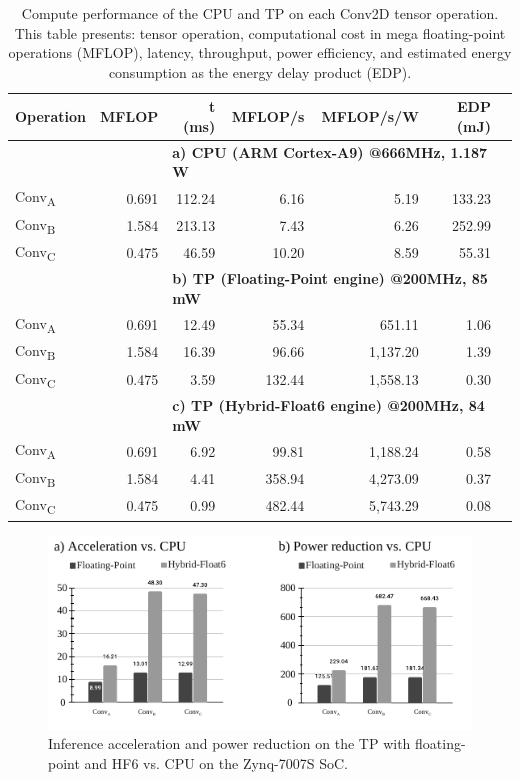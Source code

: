 \begin{table}[!t]\centering
	\caption{Compute performance of the CPU and TP on each Conv2D tensor operation. This table presents: tensor operation, computational cost in mega floating-point operations (MFLOP), latency, throughput, power efficiency, and estimated energy consumption as the energy delay product (EDP).}\label{tab:performance}
	\scriptsize
	\begin{tabular}{lrrrrrr}\toprule
		\textbf{Operation} &\textbf{MFLOP} &\textbf{t (ms)} &\textbf{MFLOP/s} &\textbf{MFLOP/s/W} &\textbf{EDP (mJ)} \\\midrule
		& &\multicolumn{4}{l}{\textbf{a) CPU (ARM Cortex-A9) @666MHz, 1.187 W}} \\
		Conv\textsubscript{A} &0.691 &112.24 &6.16 &5.19 &133.23 \\
		Conv\textsubscript{B} &1.584 &213.13 &7.43 &6.26 &252.99 \\
		Conv\textsubscript{C} &0.475 &46.59 &10.20 &8.59 &55.31 \\
		& &\multicolumn{4}{l}{\textbf{b) TP (Floating-Point engine) @200MHz, 85 mW}} \\
		Conv\textsubscript{A} &0.691 &12.49 &55.34 &651.11 &1.06 \\
		Conv\textsubscript{B} &1.584 &16.39 &96.66 &1,137.20 &1.39 \\
		Conv\textsubscript{C} &0.475 &3.59 &132.44 &1,558.13 &0.30 \\
		& &\multicolumn{4}{l}{\textbf{c) TP (Hybrid-Float6 engine) @200MHz, 84 mW}} \\
		Conv\textsubscript{A} &0.691 &6.92 &99.81 &1,188.24 &0.58 \\
		Conv\textsubscript{B} &1.584 &4.41 &358.94 &4,273.09 &0.37 \\
		Conv\textsubscript{C} &0.475 &0.99 &482.44 &5,743.29 &0.08 \\
		\bottomrule
	\end{tabular}
\end{table}

\begin{figure}[b!]
	\centering
	\includegraphics[width=0.5\columnwidth]{./chapters/cnn_accelerator/figures/power_breakdown/acceleration_power_reduction.pdf}
	\caption{Inference acceleration and power reduction on the TP with floating-point and HF6 vs. CPU on the Zynq-7007S SoC.}
	\label{fig:acceleration}
\end{figure}


